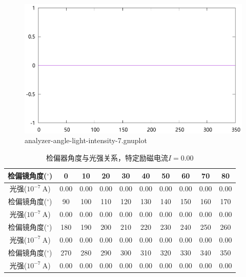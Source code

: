 \documentclass{ctexart}
\newcommand{\si}[1]{\  \mathrm{#1}}
\begin{document}
    \begin{figure}[H]
      \centering
      \includegraphics[width=\linewidth]{../output/analyzer-angle-light-intensity-7.gnuplot}
      \caption{analyzer-angle-light-intensity-7.gnuplot}
      \label{fig:analyzer-angle-light-intensity-7.gnuplot}
    \end{figure}
    \begin{table}[H]
      \centering
      \begin{tabular}{|c|c|c|c|c|c|c|c|c|c|}
        \hline
        检偏镜角度(${}^{\circ}$) & 0 & 10 & 20 & 30 & 40 & 50 & 60 & 70 & 80 \\\hline
        光强($10^{-7} \si{A}$)  & 0.00 & 0.00 & 0.00 & 0.00 & 0.00 & 0.00 & 0.00 & 0.00 & 0.00 \\\hline
        检偏镜角度(${}^{\circ}$) & 90 & 100 & 110 & 120 & 130 & 140 & 150 & 160 & 170 \\\hline
        光强($10^{-7} \si{A}$)  & 0.00 & 0.00 & 0.00 & 0.00 & 0.00 & 0.00 & 0.00 & 0.00 & 0.00  \\\hline
        检偏镜角度(${}^{\circ}$) & 180 & 190 & 200 & 210 & 220 & 230 & 240 & 250 & 260  \\\hline
        光强($10^{-7} \si{A}$)  & 0.00 & 0.00 & 0.00 & 0.00 & 0.00 & 0.00 & 0.00 & 0.00 & 0.00 \\\hline
        检偏镜角度(${}^{\circ}$) & 270 & 280 & 290 & 300 & 310 & 320 & 330 & 340 & 350 \\\hline
        光强($10^{-7} \si{A}$)  & 0.00 & 0.00 & 0.00 & 0.00 & 0.00 & 0.00 & 0.00 & 0.00 & 0.00 \\\hline
      \end{tabular}
      \caption{检偏器角度与光强关系，特定励磁电流$I=0.00$}
    \end{table}
\end{document}
